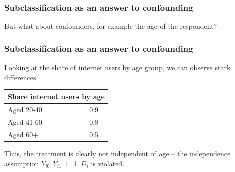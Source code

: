 \documentclass[12pt,english,dvipsnames,aspectratio=169,handout]{beamer}\usepackage[]{graphicx}\usepackage[]{xcolor}
\newcommand{\indep}{\perp \!\!\!\! \perp}
\begin{document}
\begin{frame}
  \frametitle{Subclassification as an answer to confounding}
\footnotesize
But what about confounders, for example the age of the respondent?

\vspace{15mm}
	\begin{figure}
		\centering
		\scriptsize
	\end{figure}\bigskip

\vspace{15mm}
\end{frame}



\begin{frame}
  \frametitle{Subclassification as an answer to confounding}
\footnotesize
Looking at the share of internet users by age group, we can observe stark differences.


\tiny
\begin{table}\centering
\begin{tabular}{lc}
\toprule
\multicolumn{2}{c}{Share internet users by age} \\
\midrule
Aged 20-40                                          &    0.9    \\
Aged 41-60                                          &    0.8    \\
Aged 60+                                            &    0.5    \\
\bottomrule
\end{tabular}
\end{table}

\footnotesize
Thus, the treatment is clearly not independent of age -- the independence assumption $Y_{i0},Y_{i1} {\indep} D_i$ is violated.

\end{frame}
\end{document}
